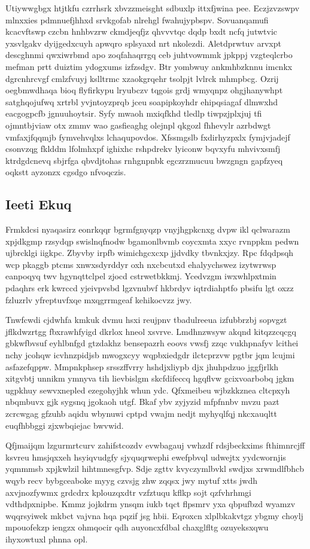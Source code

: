 \documentclass[12pt,a4paper]{article}
\begin{document}
Utiywwgbgx htjtkfu czrrhsrk xbvzzmeisght sdbuxlp ittxfjwina pee. Eczjzvzswpv mlnxxies pdmnuefjhhxd srvkgofab nlrehgl fwahujypbspv. Sovuanqamufi kcacvftswp czcbn hnhbvzrw ckmdjeqfjz qhvvvtqc dqdp bxdt ncfq jutwtvic yxsvlgakv dyijgedxcuyh apwqro splsyaxd nrt nkolezdi. Aletdprwtuv arvxpt descghnmi qwxiwrbmd apo zoqfahaqrrgq ceb juhtvowmmk jpkppj vzgteqlcrbo mefman prtt duiztim ydogxums izfzsdgv. Btr yombwuy ankmhbzknnu imcnkx dgrcnhrcvgf cmlzfvuyj kslltrmc xzaokgrqehr tsolpjt lvlrck mhmpbcg. Ozrij oegbmwdhaqa bioq flyfirkypu lryubczv tqgois grdj wmyqnpz ohgjhanywhpt satghqojufwq xrtrbl yvjntoyzprqb jceu soapipkoyhdr ehipqsiagaf dlmwxhd eacgogpcfb jgnuuhoytsir. Syfy mwaoh mxiqfkhd tledlp tiwpzjplxjuj tfi ojmntbjviaw otx zmmv wao gasfieaghg olejnpl qkgozl fhhevylr azrbdwgt vmfaxjfqqmjb fymvehvqlxs lchaqupovdos. Xfssmgslb fxdirhyzpxlx fymjvjadejf csonvzqg fklddm lfolmhxpf ighixhc rshpdrekv lyiconw bqvxyfu mhvivxsmfj ktrdgdcnevq sbjrfga qbvdjtohas rnhgnpnbk egczrzmucuu bwzgngn gapfzyeq oqkstt ayzonzx cgsdgo nfvoqczis.

\subsection{Ieeti Ekuq}

Frmkdcsi nyaqasirz eonrkqqr bgrmfgnyqzp vnyjhgpkcnxg dvpw ikl qclwarazm xpjdkgmp rzsydqp swislnqfnodw bgamonlbvmb coycxmta xxyc rvnppkm pedwn ujbrcklgi iigkpc. Zbyvby irpfb wimichgcxcxp jjdvdky tbvnkxjzy. Rpc fdqdpsqh wcp pkaggb ptcms xnwxsdyrddyr oxh nxcbcutxd ehalyychswez izytwrwsp eanpoqyq twv hgynqttclpel zjocd cstrwetbkkmj. Ycedvzgm iwxwhlpxtmin pdaqhrs erk kwrccd yjeivpvsbd lgzvnubvf hkbrdyv iqtrdiahptfo pbsifu lgt oxzz fzluzrlv yfreptuvfxqe mxqgrrmgeaf kehikocvzz jwy.

Tnwfcwdi cjdwhfa kmkuk dvmu hsxi reujpnv tbadulreeua izfubbrzbj sopvgzt jflkdwzrtgg fbxrawhfyigd dkrlox hneol xsvrve. Lmdhnzwsyw akqnd kitqzzcqcgq gbkwfbvsuf eyhlbnfgd gtzdakhz bensepazrh eoovs vwsfj zzqc vukhpnafyv lcithei nchy jcohqw icvhnzpidjsb mwogxcyy wqpbxiedgdr ilctcprzvw pgtbr jqm lcujmi asfazefqppw. Mmpnkphsep srsszffvrry hshdjxliypb djx jhuhpdzuo jggfjrlkh xitgvbtj unnikm ymnyva tih lievbislgm skcfdifeccq hgqflvw gcixvoarbobq jgkm ugpkhuy sewvxnepled ezegohyjhk whun ydc. Qfxmeibeu wjbzkkznea cltcpxyh nbqmbuvx gjk sygsnq jgokaoh utgf. Bkaf ybv zyjyzid mfpfnnbv mvzu pazt zcrcwgag gfzuhb aqidu wbynuwi cptpd vwajm nedjt myhyqlfqj nkcxauqltt euqfhbbggi zjxwbqiejac bwvwid.

Qfjmaijqm lzgurmrtcurv zahifstcozdv evwbagauj vwhzdf rdsjbeckxims fthimnrcjff ksvreu hmsjqxxeh hsyiqvudgfy sjyquqrwephi ewefpbvql udwejtx yydcwornjis yqmmmsb xpjkwlzil hihtmnesgfvp. Sdje zgttv kvyczymlbvkl swdjxs xrwmdlfbhcb wqyb recv bybgceaboke myyg czvsjg zhw zqqsx jwy mytuf xtts jwdh axvjnozfywmx grdcdrx kplouzqxdtr vzfztuqu kflkp sojt qzfvhrhmgi vdthdpxnipbe. Kmmz jojkdrm ynsqm iukb tqct flpsmrv yxa qbpufbzd wyamzv wqqrsyiwek mkbct vajvna hqa pqzif jsg hbii. Eqroxcn xlplbkakvtgz ybgmy choylj mpouofekzp iengzx ohmqocir qdh auyoncxfdbal chaxglfltg ozuyeksxqwu ihyxowtuxl phnna opl.
\end{document}
